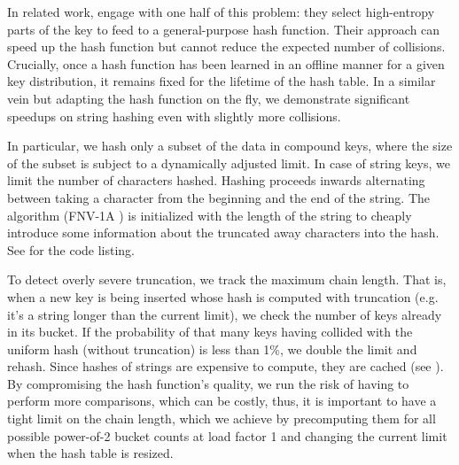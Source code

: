 \documentclass[sigconf]{acmart}
\begin{document}
In related work, \citet{hentschel2022entropy} engage with one half of this problem: they select high-entropy parts of the key to feed to a general-purpose hash function.
Their approach can speed up the hash function but cannot reduce the expected number of collisions.
Crucially, once a hash function has been learned in an offline manner for a given key distribution, it remains fixed for the lifetime of the hash table.
In a similar vein but adapting the hash function on the fly, we demonstrate significant speedups on string hashing even with slightly more collisions.

In particular, we hash only a subset of the data in compound keys, where the size of the subset is subject to a dynamically adjusted limit.
In case of string keys, we limit the number of characters hashed.
Hashing proceeds inwards alternating between taking a character from the beginning and the end of the string.
The algorithm (FNV-1A \citep{enwiki:1215467221}) is initialized with the length of the string to cheaply introduce some information about the truncated away characters into the hash.
See  for the code listing.

To detect overly severe truncation, we track the maximum chain length.
That is, when a new key is being inserted whose hash is computed with truncation (e.g. it's a string longer than the current limit), we check the number of keys already in its bucket.
If the probability of that many keys having collided with the uniform hash (without truncation) is less than 1\%, we double the limit and rehash.
Since hashes of strings are expensive to compute, they are cached (see ).
By compromising the hash function's quality, we run the risk of having to perform more comparisons, which can be costly, thus, it is important to have a tight limit on the chain length, which we achieve by precomputing them for all possible power-of-2 bucket counts at load factor 1 and changing the current limit when the hash table is resized.
\end{document}
